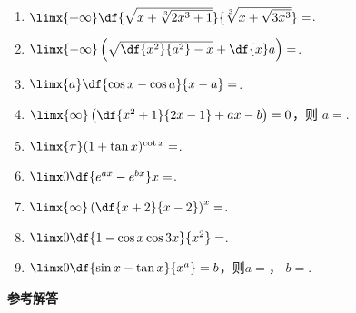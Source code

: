 \begin{enumerate}
	\item $\limx{+\infty}\df{\sqrt{x+\sqrt[3]{2x^3+1}}}{\sqrt[3]
	{x+\sqrt{3x^3}}}=$\uline{\hspace*{3cm}}.
	\item $\limx{-\infty}\left(\sqrt{\df{x^2}{a^2}-x}
	+\df{x}a\right)=$\uline{\hspace*{3cm}}.
	\item $\limx{a}\df{\cos x-\cos a}{x-a}=$\uline{\hspace*{3cm}}.
	\item $\limx{\infty}\left(\df{x^2+1}{2x-1}+ax-b\right)=0$，则
	$a=$\uline{\hspace*{3cm}}.
	\item $\limx{\pi}(1+\tan x)^{\cot x}=$\uline{\hspace*{3cm}}.
	\item $\limx0\df{e^{ax}-e^{bx}}x=$\uline{\hspace*{3cm}}.
	\item $\limx{\infty}\left(\df{x+2}{x-2}\right)^x=$\uline{\hspace*{3cm}}.
	\item $\limx0\df{1-\cos x\cos 3x}{x^2}=$\uline{\hspace*{3cm}}.
	\item $\limx0\df{\sin x-\tan x}{x^a}=b$，则$a=$\uline{\hspace*{3cm}}，
	$b=$\uline{\hspace*{3cm}}.
\end{enumerate}

\newpage

\begin{center}
	\Large\bf
	参考解答
\end{center}


